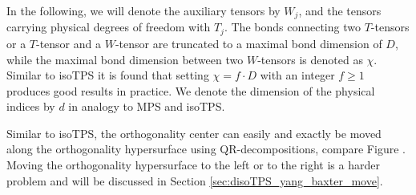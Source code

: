 In the following, we will denote the auxiliary tensors by $W_j$, and the tensors carrying physical degrees of freedom with $T_j$. The bonds connecting two $T$-tensors or a $T$-tensor and a $W$-tensor are truncated to a maximal bond dimension of $D$, while the maximal bond dimension between two $W$-tensors is denoted as $\chi$. Similar to isoTPS it is found that setting $\chi=f\cdot D$ with an integer $f\ge1$ produces good results in practice. We denote the dimension of the physical indices by $d$ in analogy to MPS and isoTPS. \par
Similar to isoTPS, the orthogonality center can easily and exactly be moved along the orthogonality hypersurface using QR-decompositions, compare Figure . Moving the orthogonality hypersurface to the left or to the right is a harder problem and will be discussed in Section \ref{sec:disoTPS_yang_baxter_move}. \par
